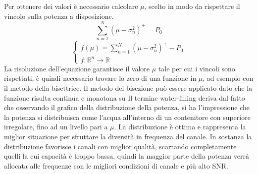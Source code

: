 Per ottenere dei valori è necessario calcolare $\mu$, scelto in modo da rispettare il vincolo sulla potenza a disposizione.
\[
    \sum_{n=1}^{N} (\mu - \sigma_n^2)^+ = P_0
\]
\[
    \begin{cases}
        f(\mu) = \sum_{n=1}^{N} (\mu - \sigma_n^2)^+ - P_0 \\
        f: \mathbb{R}^n \rightarrow \mathbb{R}
    \end{cases}
\]
La risoluzione dell'equazione garantisce il valore $\mu$ tale per cui i vincoli sono rispettati, è quindi necessario trovare lo zero di una funzione in $\mu$, ad esempio con il metodo della bisettrice.
Il metodo dei bisezione può essere applicato dato che la funzione risulta continua e monotona su%
Il termine water-filling deriva dal fatto che osservando il grafico della distribuzione della potenza, si ha l'impressione che la potenza si distribuisca come l'acqua all'interno di un contenitore con superiore irregolare, fino ad un livello pari a $\mu$.
La distribuzione è ottima e rappresenta la miglior situazione per sfruttare la diversità in frequenza del canale.
In sostanza la distribuzione favorisce i canali con miglior qualità, scartando completamente quelli la cui capacità è troppo bassa, quindi la maggior parte della potenza verrà allocata alle frequenze con le migliori condizioni di canale e più alto SNR.





%
%
%
%
%